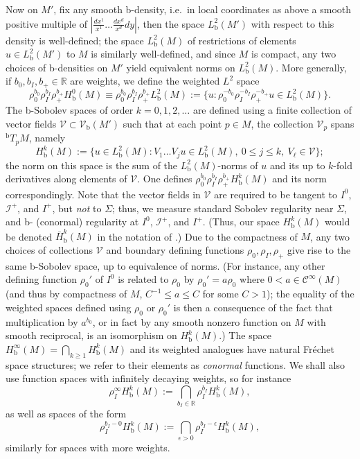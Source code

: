 \documentclass[reqno,11pt,letterpaper]{amsart}
\numberwithin{equation}{section}
\numberwithin{figure}{section}
\theoremstyle{definition}
\theoremstyle{remark}
\newcommand{\mc}{\mathcal}
\newcommand{\cC}{\mc C}
\newcommand{\ms}{\mathscr}
\newcommand{\scri}{\ms I}
\newcommand{\sV}{\ms V}
\newcommand{\R}{\mathbb{R}}
\newcommand{\eps}{\epsilon}
\newcommand{\bop}{{\mathrm{b}}}
\newcommand{\Vf}{\mathcal V}
\newcommand{\Vb}{\Vf_\bop}
\newcommand{\Tb}{{}^{\bop}T}
\newcommand{\CI}{\cC^\infty}
\newcommand{\Hb}{H_{\bop}}
\newcommand{\Hbext}{\bar H_{\bop}}
\begin{document}
Now on $M'$, fix any smooth b-density, i.e.\ in local coordinates as above a smooth positive multiple of $|\frac{d x^1}{x^1}\ldots\frac{d x^d}{x^d}d y|$, then the space $L^2_\bop(M')$ with respect to this density is well-defined; the space $L^2_\bop(M)$ of restrictions of elements $u\in L^2_\bop(M')$ to $M$ is similarly well-defined, and since $M$ is compact, any two choices of b-densities on $M'$ yield equivalent norms on $L^2_\bop(M)$. More generally, if $b_0,b_I,b_+\in\R$ are weights, we define the weighted $L^2$ space
\[
  \rho_0^{b_0}\rho_I^{b_I}\rho_+^{b_+}\Hb^0(M) \equiv \rho_0^{b_0}\rho_I^{b_I}\rho_+^{b_+}L^2_\bop(M) := \bigl\{ u \colon \rho_0^{-b_0}\rho_I^{-b_I}\rho_+^{-b_+}u\in L^2_\bop(M) \bigr\}.
\]
The b-Sobolev spaces of order $k=0,1,2,\ldots$ are defined using a finite collection of vector fields $\sV\subset\Vb(M')$ such that at each point $p\in M$, the collection $\sV_p$ spans $\Tb_p M$, namely
\[
  \Hb^k(M) := \{ u\in L^2_\bop(M) \colon V_1\dots V_j u \in L^2_\bop(M),\ 0\leq j\leq k,\ V_\ell\in\sV \};
\]
the norm on this space is the sum of the $L^2_\bop(M)$-norms of $u$ and its up to $k$-fold derivatives along elements of $\sV$. One defines $\rho_0^{b_0}\rho_I^{b_I}\rho_+^{b_+}\Hb^k(M)$ and its norm correspondingly. Note that the vector fields in $\sV$ are required to be tangent to $I^0$, $\scri^+$, and $I^+$, but \emph{not} to $\Sigma$; thus, we measure standard Sobolev regularity near $\Sigma$, and b- (conormal) regularity at $I^0$, $\scri^+$, and $I^+$. (Thus, our space $\Hb^k(M)$ would be denoted $\Hbext^k(M)$ in the notation of \cite[Appendix~B]{HormanderAnalysisPDE3}.) Due to the compactness of $M$, any two choices of collections $\sV$ and boundary defining functions $\rho_0,\rho_I,\rho_+$ give rise to the same b-Sobolev space, up to equivalence of norms. (For instance, any other defining function $\rho_0'$ of $I^0$ is related to $\rho_0$ by $\rho_0'=a\rho_0$ where $0<a\in\CI(M)$ (and thus by compactness of $M$, $C^{-1}\leq a\leq C$ for some $C>1$); the equality of the weighted spaces defined using $\rho_0$ or $\rho_0'$ is then a consequence of the fact that multiplication by $a^{b_0}$, or in fact by any smooth nonzero function on $M$ with smooth reciprocal, is an isomorphism on $\Hb^k(M)$.) The space $\Hb^\infty(M)=\bigcap_{k\geq 1}\Hb^k(M)$ and its weighted analogues have natural Fr\'echet space structures; we refer to their elements as \emph{conormal} functions. We shall also use function spaces with infinitely decaying weights, so for instance
\begin{equation}
\label{EqCptFInftyW}
  \rho_I^\infty\Hb^k(M) := \bigcap_{b_I\in\R}\rho_I^{b_I}\Hb^k(M),
\end{equation}
as well as spaces of the form
\[
  \rho_I^{b_I-0}\Hb^k(M) := \bigcap_{\eps>0}\rho_I^{b_I-\eps}\Hb^k(M),
\]
similarly for spaces with more weights.
\end{document}
